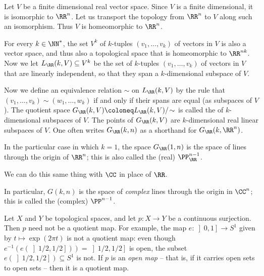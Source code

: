 \begin{exm}
	Let $V$ be a finite dimensional real vector space.
	Since $V$ is a finite dimensional, it is isomorphic to $\RR^n$.
	Let us transport the topology from $\RR^n$ to $V$ along such an isomorphism.%
	Thus $V$ is homeomorphic to $\RR^n$.

	For every $k \in \NN^{\ast}$, the set $V^k$ of $k$-tuples $(v_1, \dots, v_k)$ of vectors in $V$ is also a vector space, and thus also a topological space that is homeomorphic to $\RR^{nk}$.
	Now we let $L_{\RR}(k,V) \subseteq V^k$ be the set of $k$-tuples $(v_1, \dots, v_k)$ of vectors in $V$ that are linearly independent,
	so that they span a $k$-dimensional subspace of $V$.

	Now we define an equivalence relation $\sim$ on $L_{\RR}(k, V)$ by the rule that $(v_1, \dots, v_k) \sim (w_1, \dots, w_k)$ if and only if their spans are equal (as subspaces of $V$).
	The quotient space $G_{\RR}(k,V) \coloneq L_{\RR}(k,V)/\!\sim$ is called the  of $k$-dimensional subspaces of $V$.
	The points of $G_{\RR}(k,V)$ are $k$-dimensional real linear subspaces of $V$.
	One often writes $G_{\RR}(k,n)$ as a shorthand for $G_{\RR}(k, \RR^n)$.

	In the particular case in which $k=1$, the space $G_{\RR}(1,n)$ is the space of lines through the origin of $\RR^n$;
	this is also called the (real)  $\PP^{n-1}_{\RR}$.

	We can do this same thing with $\CC$ in place%
	of $\RR$.

	In particular, $G(k,n)$ is the space of \emph{complex} lines through the origin in $\CC^n$;
	this is called the (complex)  $\PP^{n-1}$.
\end{exm}

\begin{nul}
	Let $X$ and $Y$ be topological spaces, and let $p \colon X \to Y $ be a continuous surjection.
	Then $p$ need not be a quotient map.
	For example, the map $e \colon \left]0,1\right] \to S^1$ given by $t \mapsto \exp(2\pi t)$ is not a quotient map: even though $e^{-1}(e(\left]1/2,1/2\right])) = \left]1/2,1/2\right]$ is open, the subset $e(\left]1/2,1/2\right]) \subseteq S^1$ is not.
	If $p$ is an \emph{open map} -- that is, if it carries open sets to open sets -- then it is a quotient map.
\end{nul}

